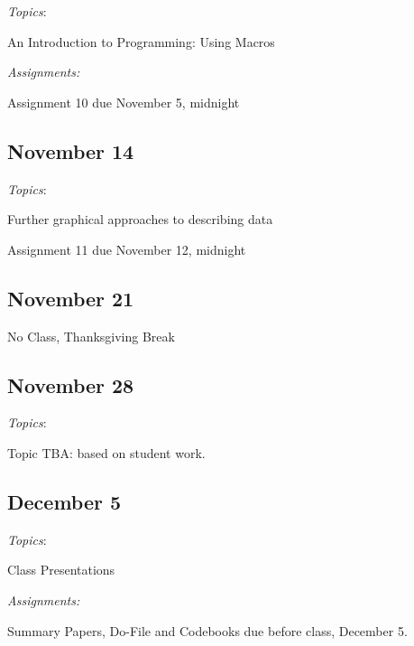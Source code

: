 \documentclass[12pt]{article}
\begin{document}
\begin{flushleft}
\textit{Topics}:

An Introduction to Programming: Using Macros

\textit {Assignments:}

Assignment 10 due November 5, midnight

\subsection{November 14}

\textit{Topics}:

Further graphical approaches to describing data 

Assignment 11 due November 12, midnight

\subsection{November 21}

No Class, Thanksgiving Break


\subsection{November 28}


\textit{Topics}:

Topic TBA: based on student work. 


\subsection{December 5}

\textit{Topics}:

Class Presentations

\textit {Assignments:}

Summary Papers, Do-File and Codebooks due before class, December 5. 


\end{flushleft}
\end{document}
